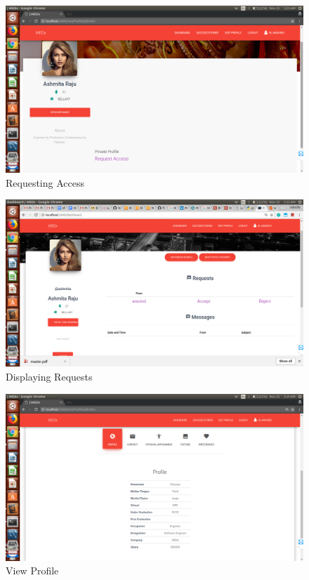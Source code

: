 \documentclass[12pt]{report}
\begin{document}
\begin{figure}[!htb]
    \centering
    \includegraphics[width=1\textwidth]{sc-10.png}
    \caption{Requesting Access}
    \label{fig:Requesting Access}
\end{figure}

\begin{figure}[!htb]
    \centering
    \includegraphics[width=1\textwidth]{sc-11.png}
    \caption{Displaying Requests}
    \label{fig:Displaying Requests}
\end{figure}

\begin{figure}[!htb]
    \centering
    \includegraphics[width=1\textwidth]{sc-12.png}
    \caption{View Profile}
    \label{fig:View Profile}
\end{figure}
\end{document}
